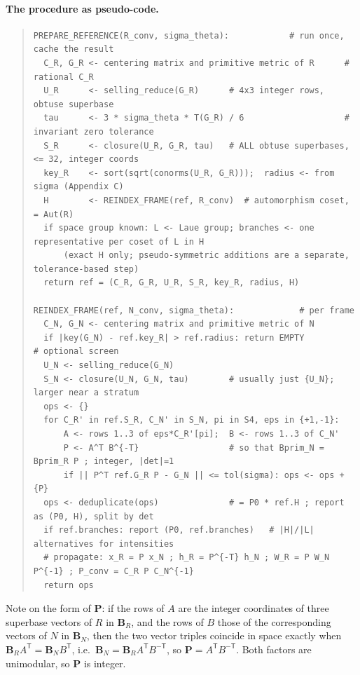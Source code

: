 \documentclass[11pt]{article}
\newcommand{\Pop}{\mathbf{P}}
\newcommand{\Bbasis}{\mathbf{B}}
\begin{document}
\paragraph{The procedure as pseudo-code.}
\begin{quote}\small\begin{verbatim}
PREPARE_REFERENCE(R_conv, sigma_theta):            # run once, cache the result
  C_R, G_R <- centering matrix and primitive metric of R      # rational C_R
  U_R      <- selling_reduce(G_R)      # 4x3 integer rows, obtuse superbase
  tau      <- 3 * sigma_theta * T(G_R) / 6                    # invariant zero tolerance
  S_R      <- closure(U_R, G_R, tau)   # ALL obtuse superbases, <= 32, integer coords
  key_R    <- sort(sqrt(conorms(U_R, G_R)));  radius <- from sigma (Appendix C)
  H        <- REINDEX_FRAME(ref, R_conv)  # automorphism coset, = Aut(R)
  if space group known: L <- Laue group; branches <- one representative per coset of L in H
      (exact H only; pseudo-symmetric additions are a separate, tolerance-based step)
  return ref = (C_R, G_R, U_R, S_R, key_R, radius, H)

REINDEX_FRAME(ref, N_conv, sigma_theta):             # per frame
  C_N, G_N <- centering matrix and primitive metric of N
  if |key(G_N) - ref.key_R| > ref.radius: return EMPTY           # optional screen
  U_N <- selling_reduce(G_N)
  S_N <- closure(U_N, G_N, tau)        # usually just {U_N}; larger near a stratum
  ops <- {}
  for C_R' in ref.S_R, C_N' in S_N, pi in S4, eps in {+1,-1}:
      A <- rows 1..3 of eps*C_R'[pi];  B <- rows 1..3 of C_N'
      P <- A^T B^{-T}                  # so that Bprim_N = Bprim_R P ; integer, |det|=1
      if || P^T ref.G_R P - G_N || <= tol(sigma): ops <- ops + {P}
  ops <- deduplicate(ops)              # = P0 * ref.H ; report as (P0, H), split by det
  if ref.branches: report (P0, ref.branches)   # |H|/|L| alternatives for intensities
  # propagate: x_R = P x_N ; h_R = P^{-T} h_N ; W_R = P W_N P^{-1} ; P_conv = C_R P C_N^{-1}
  return ops
\end{verbatim}\end{quote}
Note on the form of $\Pop$: if the rows of $A$ are the integer coordinates of three superbase vectors of $R$ in $\Bbasis_R$, and the rows of $B$ those of the corresponding vectors of $N$ in $\Bbasis_N$, then the two vector triples coincide in space exactly when $\Bbasis_R A^{\mathsf T}=\Bbasis_N B^{\mathsf T}$, i.e.\ $\Bbasis_N=\Bbasis_R A^{\mathsf T}B^{-\mathsf T}$, so $\Pop=A^{\mathsf T}B^{-\mathsf T}$. Both factors are unimodular, so $\Pop$ is integer.
\end{document}
